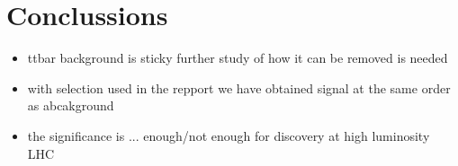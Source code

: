 \documentclass[tightenline,notitlepage,nofootinbib]{revtex4-1}
\begin{document}
\section{Conclussions}

\begin{itemize}
\item ttbar background is sticky further study of how it can be removed is needed
\item with selection used in the repport we have obtained signal at the same order as abcakground
\item the significance is ... enough/not enough for discovery at high luminosity LHC
\end{itemize}

  
  
  
\nocite{*}
{}
%
  
\end{document}
